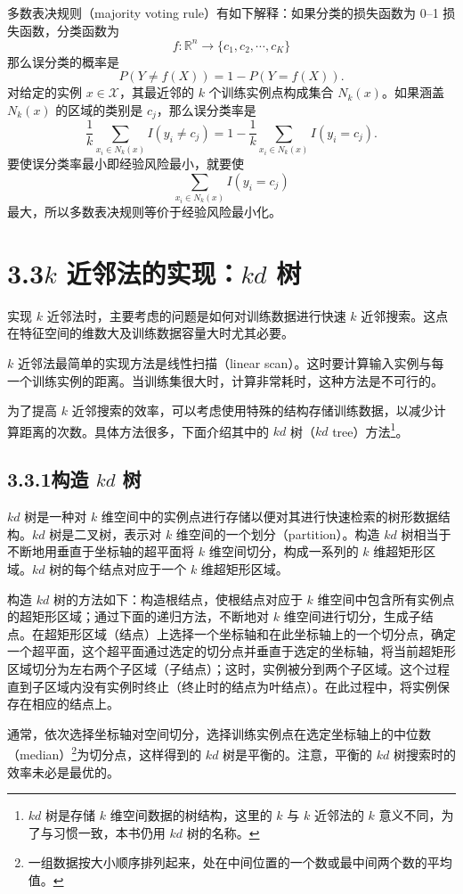 \documentclass[UTF8,12pt,a4paper,fontset=fandol]{ctexart}
\begin{document}
多数表决规则（majority voting rule）有如下解释：如果分类的损失函数为 0--1 损失函数，分类函数为
\[
f:\mathbb{R}^n\to \{c_1,c_2,\cdots,c_K\}
\]
那么误分类的概率是
\[
P(Y\ne f(X))=1-P(Y=f(X)).
\]
对给定的实例 $x\in\mathcal{X}$，其最近邻的 $k$ 个训练实例点构成集合 $N_k(x)$。如果涵盖 $N_k(x)$ 的区域的类别是 $c_j$，那么误分类率是
\[
\frac{1}{k}\sum_{x_i\in N_k(x)}I(y_i\ne c_j)
=1-\frac{1}{k}\sum_{x_i\in N_k(x)}I(y_i=c_j).
\]
要使误分类率最小即经验风险最小，就要使
\[
\sum_{x_i\in N_k(x)}I(y_i=c_j)
\]
最大，所以多数表决规则等价于经验风险最小化。

\section*{3.3\quad $k$ 近邻法的实现：$kd$ 树}

实现 $k$ 近邻法时，主要考虑的问题是如何对训练数据进行快速 $k$ 近邻搜索。这点在特征空间的维数大及训练数据容量大时尤其必要。

$k$ 近邻法最简单的实现方法是线性扫描（linear scan）。这时要计算输入实例与每一个训练实例的距离。当训练集很大时，计算非常耗时，这种方法是不可行的。

为了提高 $k$ 近邻搜索的效率，可以考虑使用特殊的结构存储训练数据，以减少计算距离的次数。具体方法很多，下面介绍其中的 $kd$ 树（$kd$ tree）方法\footnote{$kd$ 树是存储 $k$ 维空间数据的树结构，这里的 $k$ 与 $k$ 近邻法的 $k$ 意义不同，为了与习惯一致，本书仍用 $kd$ 树的名称。}。

\subsection*{3.3.1\quad 构造 $kd$ 树}

$kd$ 树是一种对 $k$ 维空间中的实例点进行存储以便对其进行快速检索的树形数据结构。$kd$ 树是二叉树，表示对 $k$ 维空间的一个划分（partition）。构造 $kd$ 树相当于不断地用垂直于坐标轴的超平面将 $k$ 维空间切分，构成一系列的 $k$ 维超矩形区域。$kd$ 树的每个结点对应于一个 $k$ 维超矩形区域。

构造 $kd$ 树的方法如下：构造根结点，使根结点对应于 $k$ 维空间中包含所有实例点的超矩形区域；通过下面的递归方法，不断地对 $k$ 维空间进行切分，生成子结点。在超矩形区域（结点）上选择一个坐标轴和在此坐标轴上的一个切分点，确定一个超平面，这个超平面通过选定的切分点并垂直于选定的坐标轴，将当前超矩形区域切分为左右两个子区域（子结点）；这时，实例被分到两个子区域。这个过程直到子区域内没有实例时终止（终止时的结点为叶结点）。在此过程中，将实例保存在相应的结点上。

通常，依次选择坐标轴对空间切分，选择训练实例点在选定坐标轴上的中位数（median）\footnote{一组数据按大小顺序排列起来，处在中间位置的一个数或最中间两个数的平均值。}为切分点，这样得到的 $kd$ 树是平衡的。注意，平衡的 $kd$ 树搜索时的效率未必是最优的。
\end{document}
